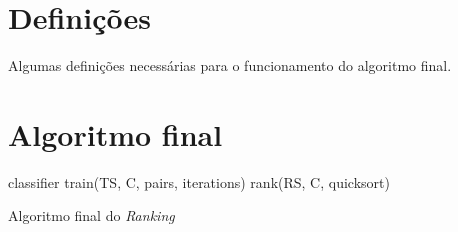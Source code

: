 \section{Definições}
Algumas definições necessárias para o funcionamento do algoritmo final.

\section{Algoritmo final}

\begin{algorithm}
\begin{algorithmic}

\STATE classifier \gets train(TS, C, pairs, iterations)
\STATE rank(RS, C, quicksort)

\caption{Algoritmo final do \emph{Ranking}}
\label{alg:ranking}

\end{algorithmic}
\end{algorithm}
